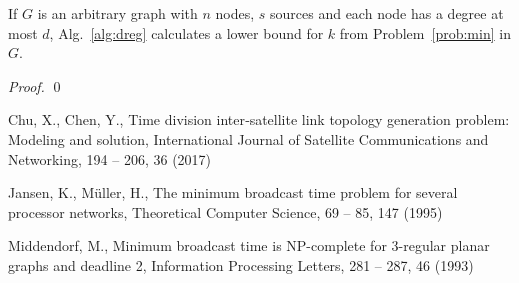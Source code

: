 \begin{proposition}
If $G$ is an arbitrary graph with $n$ nodes, $s$ sources and each node has a degree at most $d$, Alg.~\ref{alg:dreg} calculates a lower bound for $k$ from Problem~\ref{prob:min} in $G$.
\end{proposition}
\begin{proof}
\qed
\end{proof}




\begin{thebibliography}{}
%
%
Chu, X., Chen, Y.,
Time division inter‐satellite link topology generation problem: Modeling and solution,
International Journal of Satellite Communications and Networking, 194 -- 206, 36 (2017)

Jansen, K., M\"uller, H.,
The minimum broadcast time problem for several processor networks, 
Theoretical Computer Science, 69 -- 85, 147 (1995)

Middendorf, M.,
Minimum broadcast time is NP-complete for 3-regular planar graphs and deadline 2,
Information Processing Letters, 281 -- 287, 46 (1993)

\end{thebibliography}



